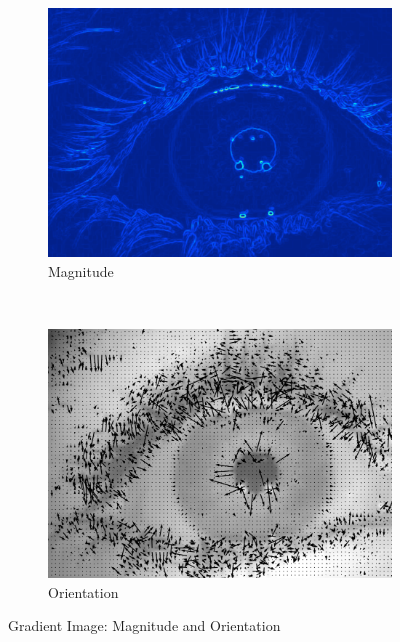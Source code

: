 \begin{figure}[h!]
	\centering
	
	\begin{subfigure}[b]{0.5\textwidth}
		\centering
		\includegraphics[width=\textwidth]{final/images/magnitude.png}
		\caption{Magnitude}
		\label{subfig:magnitude}
	\end{subfigure}%
	~
	\begin{subfigure}[b]{0.5\textwidth}
		\centering
		\includegraphics[width=\textwidth]{final/images/quiver.png}
		\caption{Orientation}
		\label{subfig:quiver}
	\end{subfigure}
	
	\caption{Gradient Image: Magnitude and Orientation}
\end{figure}


